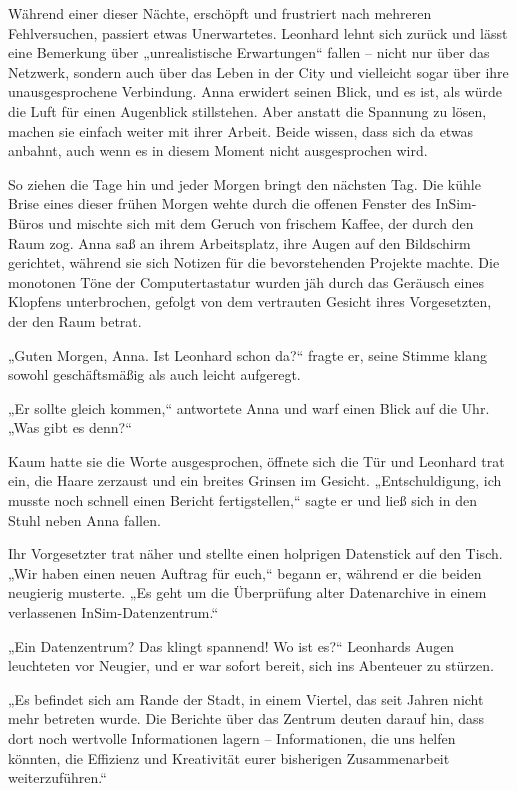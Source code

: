 \documentclass[
]{article}
\begin{document}
Während einer dieser Nächte, erschöpft und frustriert nach mehreren
Fehlversuchen, passiert etwas Unerwartetes. Leonhard lehnt sich zurück
und lässt eine Bemerkung über „unrealistische Erwartungen`` fallen --
nicht nur über das Netzwerk, sondern auch über das Leben in der City und
vielleicht sogar über ihre unausgesprochene Verbindung. Anna erwidert
seinen Blick, und es ist, als würde die Luft für einen Augenblick
stillstehen. Aber anstatt die Spannung zu lösen, machen sie einfach
weiter mit ihrer Arbeit. Beide wissen, dass sich da etwas anbahnt, auch
wenn es in diesem Moment nicht ausgesprochen wird.

So ziehen die Tage hin und jeder Morgen bringt den nächsten Tag. Die
kühle Brise eines dieser frühen Morgen wehte durch die offenen Fenster
des InSim-Büros und mischte sich mit dem Geruch von frischem Kaffee, der
durch den Raum zog. Anna saß an ihrem Arbeitsplatz, ihre Augen auf den
Bildschirm gerichtet, während sie sich Notizen für die bevorstehenden
Projekte machte. Die monotonen Töne der Computertastatur wurden jäh
durch das Geräusch eines Klopfens unterbrochen, gefolgt von dem
vertrauten Gesicht ihres Vorgesetzten, der den Raum betrat.

„Guten Morgen, Anna. Ist Leonhard schon da?{\kern0pt}`` fragte er, seine
Stimme klang sowohl geschäftsmäßig als auch leicht aufgeregt.

„Er sollte gleich kommen,`` antwortete Anna und warf einen Blick auf die
Uhr. „Was gibt es denn?{\kern0pt}``

Kaum hatte sie die Worte ausgesprochen, öffnete sich die Tür und
Leonhard trat ein, die Haare zerzaust und ein breites Grinsen im
Gesicht. „Entschuldigung, ich musste noch schnell einen Bericht
fertigstellen,`` sagte er und ließ sich in den Stuhl neben Anna fallen.

Ihr Vorgesetzter trat näher und stellte einen holprigen Datenstick auf
den Tisch. „Wir haben einen neuen Auftrag für euch,`` begann er, während
er die beiden neugierig musterte. „Es geht um die Überprüfung alter
Datenarchive in einem verlassenen InSim-Datenzentrum.``

„Ein Datenzentrum? Das klingt spannend! Wo ist es?{\kern0pt}`` Leonhards
Augen leuchteten vor Neugier, und er war sofort bereit, sich ins
Abenteuer zu stürzen.

„Es befindet sich am Rande der Stadt, in einem Viertel, das seit Jahren
nicht mehr betreten wurde. Die Berichte über das Zentrum deuten darauf
hin, dass dort noch wertvolle Informationen lagern -- Informationen, die
uns helfen könnten, die Effizienz und Kreativität eurer bisherigen
Zusammenarbeit weiterzuführen.``
\end{document}
